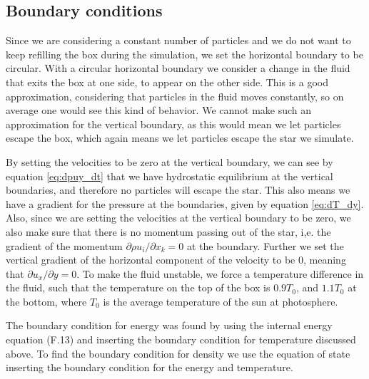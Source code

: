 \documentclass[a4paper,10pt]{article}
\begin{document}
\subsection{Boundary conditions}
Since we are considering a constant number of particles and we do not want to keep refilling the box during the simulation, we set the horizontal boundary to be circular. With a circular horizontal boundary we consider a change in the fluid that exits the box at one side, to appear on the other side. This is a good approximation, considering that particles in the fluid moves constantly, so on average one would see this kind of behavior. We cannot make such an approximation for the vertical boundary, as this would mean we let particles escape the box, which again means  we let particles escape the star we simulate. 

By setting the velocities to be zero at the vertical boundary, we can see by equation \eqref{eq:dpuy_dt} that we have hydrostatic equilibrium at the vertical boundaries, and therefore no particles will escape the star. This also means we have a gradient for the pressure at the boundaries, given by equation \eqref{eq:dT_dy}. Also, since we are setting the velocities at the vertical boundary to be zero, we also make sure that there is no momentum passing out of the star, i,e. the gradient of the momentum $\partial \rho u_i/\partial x_k = 0$ at the boundary. Further we set the vertical gradient of the horizontal component of the velocity to be 0, meaning that $\partial u_x/\partial y = 0$. To make the fluid unstable, we force a temperature difference in the fluid, such that the temperature on the top of the box is $0.9T_0$, and $1.1T_0$ at the bottom, where $T_0$ is the average temperature of the sun at photosphere.

The boundary condition for energy was found by using the internal energy equation (F.13) and inserting the boundary condition for temperature discussed above. To find the boundary condition for density we use the equation of state inserting the boundary condition for the energy and temperature. 
\end{document}
